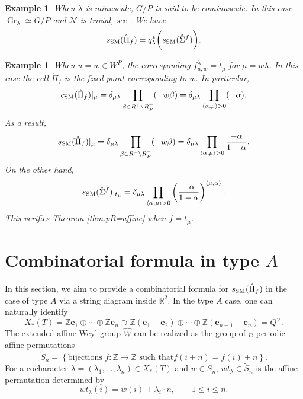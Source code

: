 \documentclass[12pt]{amsart}
\newtheorem{Eg}[Th]{Example}
\def\CSM{c_{\rm SM}}
\def\SSM{s_{\rm SM}}
\def\Gr{\operatorname{Gr}}
\def\Gr{\operatorname{Gr}}
\begin{document}
    

    



\begin{Eg}\label{eg:cominsculecase}
When $\lambda$ is minuscule, $G/P$ is said to be cominuscule. 
In this case $\Gr_\lambda\simeq G/P$ and $\mathcal{N}$ is trivial, see \cite{Zhu}. 
    We have 
    $$\SSM(\mathring{\Pi}_f)
    = q^*_\lambda\bigg(\SSM(\mathring{\Sigma}^{f})\bigg).
    $$
\end{Eg}


\begin{Eg}
When $u=w\in W^P$, 
the corresponding $f^\lambda_{u,w}=t_{\mu}$ for $\mu=w\lambda$. 
In this case the cell $\mathring{\Pi}_f$ is the fixed point corresponding to $w$. In particular, 
$$\CSM(\mathring{\Pi}_f)|_{\mu}=\delta_{\mu\lambda}\prod_{\beta\in R^+\setminus R_P^+}(-w\beta)
=\delta_{\mu\lambda}\prod_{\langle\alpha,\mu\rangle>0}(-\alpha).$$
As a result, 
$$\SSM(\mathring{\Pi}_f)|_{\mu}=\delta_{\mu\lambda}\prod_{\beta\in R^+\setminus R_P^+}(-w\beta)
=\delta_{\mu\lambda}\prod_{\langle\alpha,\mu\rangle>0}\frac{-\alpha}{1-\alpha}.$$
On the other hand, 
$$\SSM(\mathring{\Sigma}^{f})|_{t_\mu}
=\delta_{\mu\lambda}\prod_{\langle\alpha,\mu\rangle>0}
\left(\frac{-\alpha}{1-\alpha}\right)^{\langle\mu,\alpha\rangle}.$$
This verifies Theorem \ref{thm:pR=affine} when $f=t_\mu$.
\end{Eg}








\section{Combinatorial formula in type $A$}\label{combinpart}

In this section, we aim to provide  a combinatorial formula for $\SSM(\mathring{\Pi}_f)$ in the case of type $A$ via a string diagram inside $\mathbb{R}^2$.
In the type $A$ case, one can naturally identify
$$X_*(T)=\mathbb{Z}\mathbf{e}_1\oplus \cdots \oplus \mathbb{Z}\mathbf{e}_n\supset 
\mathbb{Z}(\mathbf{e}_1-\mathbf{e}_2)\oplus \cdots \oplus 
\mathbb{Z}(\mathbf{e}_{n-1}-\mathbf{e}_n)
=Q^\vee.$$
The extended affine Weyl group $\widehat{W}$ can be realized as the group of $n$-periodic affine permutations
$$\tilde{S}_n=\left\{\text{bijections   $f\colon  \mathbb{Z}\to \mathbb{Z}$ such that
$f(i+n)=f(i)+n$}\right\}.$$
For a cocharacter $\lambda=(\lambda_1,\ldots,\lambda_n)\in X_*(T)$ and $w\in S_n$,   $wt_{\lambda}\in \tilde{S}_n$ is the affine permutation   determined by 
$$wt_{\lambda}(i)=w(i)+\lambda_i\cdot n,\qquad 1\leq i\leq n.$$
\end{document}
